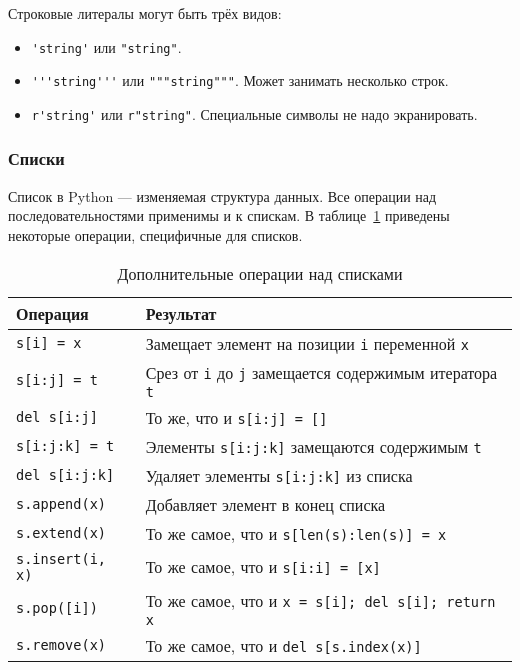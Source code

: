 Строковые литералы могут быть трёх видов:
\begin{itemize}
  \item \lstinline{'string'} или \lstinline{"string"}.
  \item \lstinline{'''string'''} или \lstinline{"""string"""}. Может занимать несколько строк.
  \item \lstinline{r'string'} или \lstinline{r"string"}. Специальные символы не надо экранировать.
\end{itemize}

\subsubsection{Списки}
Список в Python --- изменяемая структура данных. Все операции над последовательностями применимы и к спискам. В таблице~\ref{tbl:py-listops} приведены некоторые операции, специфичные для списков.
\begin{table}[h!]
  \begin{center}
    \caption{Дополнительные операции над списками\label{tbl:py-listops}}
    \begin{tabular}{lp{9cm}}
      \toprule
      Операция & Результат \\
      \midrule
      \texttt{s[i] = x} & Замещает элемент на позиции \texttt{i} переменной \texttt{x} \\
      \texttt{s[i:j] = t} & Срез от \texttt{i} до \texttt{j} замещается содержимым итератора \texttt{t} \\
      \texttt{del s[i:j]} & То же, что и \texttt{s[i:j] = []} \\
      \texttt{s[i:j:k] = t} & Элементы \texttt{s[i:j:k]} замещаются содержимым \texttt{t} \\
      \texttt{del s[i:j:k]} & Удаляет элементы \texttt{s[i:j:k]} из списка \\
      \texttt{s.append(x)} & Добавляет элемент в конец списка \\
      \texttt{s.extend(x)} & То же самое, что и \texttt{s[len(s):len(s)] = x} \\
      \texttt{s.insert(i, x)} & То же самое, что и \texttt{s[i:i] = [x]} \\
      \texttt{s.pop([i])} & То же самое, что и \texttt{x = s[i]; del s[i]; return x} \\
      \texttt{s.remove(x)} & То же самое, что и \texttt{del s[s.index(x)]} \\
      \bottomrule
    \end{tabular}
  \end{center}
\end{table}

